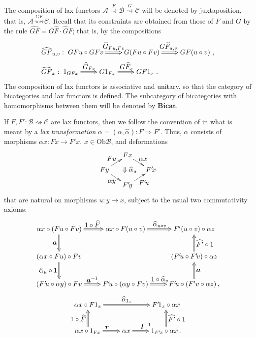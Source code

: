 \documentclass[]{amsart}
\begin{document}
The composition of lax functors ${\ensuremath{\mathcal{A}}} \overset{F}\rightsquigarrow {\ensuremath{\mathcal{B}}}\overset{G}\rightsquigarrow {\ensuremath{\mathcal{C}}}$
will be denoted by juxtaposition, that is, ${\ensuremath{\mathcal{A}}} \overset{GF}\rightsquigarrow {\ensuremath{\mathcal{C}}}$. Recall that its
constraints are obtained from those of $F$ and $G$ by the rule $\widehat{GF}=G\widehat{F}\cdot
\widehat{G}F$; that is, by the compositions
$$
\begin{array}{l}
\widehat{GF}_{u,v}: \xymatrix{GFu\circ GFv\ar@{=>}[r]^{\textstyle \widehat{G}_{Fu,Fv}}&G(Fu\circ Fv)\ar@{=>}[r]^{\textstyle G\widehat{F}_{u,v}}&GF(u\circ v)},\\[5pt]
\widehat{GF}_{x}:\xymatrix{1_{GFx}\ar@{=>}[r]^{\textstyle
\widehat{G}_{Fx}}&G1_{Fx}\ar@{=>}[r]^{\textstyle G\widehat{F}_x}&GF1_x}.
\end{array}
$$
The composition of lax functors is associative and unitary, so that the category of bicategories
and lax functors is defined. The subcategory of bicategories with homomorphisms between them will
be denoted by ${\ensuremath{\mathbf{Bicat}}}$.

If $F,F':{\ensuremath{\mathcal{B}}} \rightsquigarrow {\ensuremath{\mathcal{C}}}$ are lax functors, then we follow the convention of \cite{g-p-s} in
what is meant by a {\em lax transformation} ${\alpha=(\alpha,\widehat{\alpha}):F\Rightarrow F'}$.
Thus, $\alpha$ consists of morphisms ${\alpha x:Fx\to F'x}$, $x\in \mbox{Ob}{\ensuremath{\mathcal{B}}}$, and deformations
$$
\xymatrix@C=7pt@R=7pt{&Fx\ar[rd]^{\textstyle \alpha x}&\\Fy\ar[ru]^{\textstyle
Fu}\ar[rd]_{\textstyle \alpha y}&~~ \Downarrow\widehat{\alpha}_u&F'\!x\\&F'\!y\ar[ru]_{\textstyle
F'\!u}&}
$$
that are natural on morphisms $u:y\to x$, subject to the usual two commutativity axioms:
$$
\xymatrix{\alpha x\circ(Fu\circ Fv)\ar@{=>}[r]^{\textstyle 1\circ \widehat{F}} \ar@{=>}[d]_{\textstyle \boldsymbol{a}} &\alpha x\circ F(u\circ v)\ar@{=>}[r]^{\textstyle \widehat{\alpha}_{u\circ v}}&F'(u\circ v)\circ \alpha z\\
(\alpha x\circ Fu)\circ Fv \ar@{=>}[d]_{\textstyle \hat{\alpha}_u\circ 1} &&(F'\!u\circ F'\!v)\circ \alpha z \ar@{=>}[u]_{\textstyle \widehat{F'}\circ 1}\\
(F'\!u\circ \alpha y)\circ Fv \ar@{=>}[r]^{\textstyle \boldsymbol{a}^{-1}}&F'\!u\circ(\alpha y\circ
Fv)\ar@{=>}[r]^{\textstyle  1\circ \widehat{\alpha}_v} & F'\!u\circ (F'v\circ \alpha z)\,,
\ar@{=>}[u]_{\textstyle \boldsymbol{a}}}
$$
$$
\xymatrix{\alpha x\circ F1_x\ar@{=>}[rr]^{\textstyle \widehat{\alpha}_{1_x}}& &F'\!1_x\circ \alpha
x\\\alpha x\circ 1_{Fx}\ar@{=>}[u]^{\textstyle 1\circ \widehat{F}} \ar@{=>}[r]^{\textstyle
\boldsymbol{r}}&\alpha x\ar@{=>}[r]^{\textstyle \boldsymbol{l}^{-1}}&1_{F'\!x}\circ \alpha x\,.
\ar@{=>}[u]_{\textstyle \widehat{F'}\circ 1}}
$$
\end{document}
